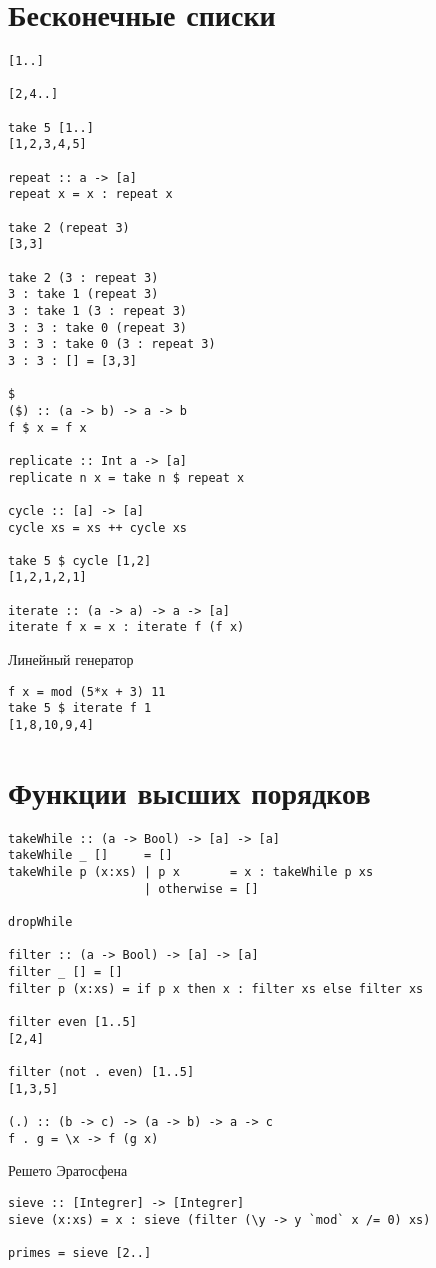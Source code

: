 \documentclass[a4paper,10pt]{article}
\begin{document}
\section{Бесконечные списки}
\begin{lstlisting}
[1..]

[2,4..]

take 5 [1..]
[1,2,3,4,5]

repeat :: a -> [a]
repeat x = x : repeat x

take 2 (repeat 3)
[3,3]

take 2 (3 : repeat 3)
3 : take 1 (repeat 3)
3 : take 1 (3 : repeat 3)
3 : 3 : take 0 (repeat 3)
3 : 3 : take 0 (3 : repeat 3)
3 : 3 : [] = [3,3]

$
($) :: (a -> b) -> a -> b
f $ x = f x

replicate :: Int a -> [a]
replicate n x = take n $ repeat x

cycle :: [a] -> [a]
cycle xs = xs ++ cycle xs

take 5 $ cycle [1,2]
[1,2,1,2,1]

iterate :: (a -> a) -> a -> [a]
iterate f x = x : iterate f (f x)
\end{lstlisting}

Линейный генератор 
\begin{lstlisting}
f x = mod (5*x + 3) 11
take 5 $ iterate f 1
[1,8,10,9,4]
\end{lstlisting}

\section{Функции высших порядков}

\begin{lstlisting}
takeWhile :: (a -> Bool) -> [a] -> [a]
takeWhile _ []     = []
takeWhile p (x:xs) | p x       = x : takeWhile p xs
                   | otherwise = []

dropWhile

filter :: (a -> Bool) -> [a] -> [a]
filter _ [] = []
filter p (x:xs) = if p x then x : filter xs else filter xs

filter even [1..5]
[2,4]

filter (not . even) [1..5]
[1,3,5]

(.) :: (b -> c) -> (a -> b) -> a -> c
f . g = \x -> f (g x)
\end{lstlisting}

Решето Эратосфена

\begin{lstlisting}
sieve :: [Integrer] -> [Integrer]
sieve (x:xs) = x : sieve (filter (\y -> y `mod` x /= 0) xs)

primes = sieve [2..]
\end{lstlisting}
\end{document}
